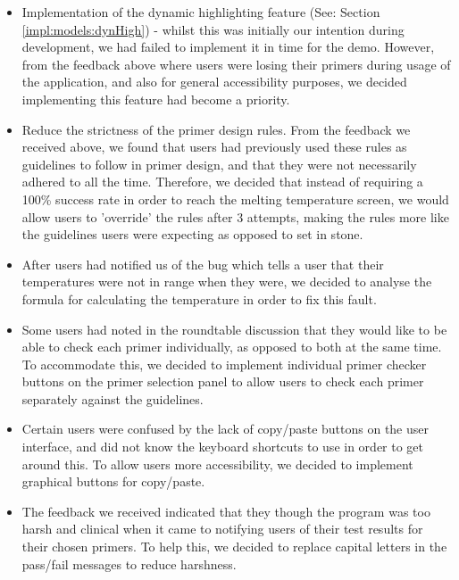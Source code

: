 \begin{itemize}

\item Implementation of the dynamic highlighting feature (See: Section \ref{impl:models:dynHigh}) - whilst this was initially our intention during development, we had failed to implement it in time for the demo. However, from the feedback above where users were losing their primers during usage of the application, and also for general accessibility purposes, we decided implementing this feature had become a priority.

\item Reduce the strictness of the primer design rules. From the feedback we received above, we found that users had previously used these rules as guidelines to follow in primer design, and that they were not necessarily adhered to all the time. Therefore, we decided that instead of requiring a 100\% success rate in order to reach the melting temperature screen, we would allow users to 'override' the rules after 3 attempts, making the rules more like the guidelines users were expecting as opposed to set in stone.

\item After users had notified us of the bug which tells a user that their temperatures were not in range when they were, we decided to analyse the formula for calculating the temperature in order to fix this fault.

\item Some users had noted in the roundtable discussion that they would like to be able to check each primer individually, as opposed to both at the same time. To accommodate this, we decided to implement individual primer checker buttons on the primer selection panel to allow users to check each primer separately against the guidelines.

\item Certain users were confused by the lack of copy/paste buttons on the user interface, and did not know the keyboard shortcuts to use in order to get around this. To allow users more accessibility, we decided to implement graphical buttons for copy/paste.

\item The feedback we received indicated that they though the program was too harsh and clinical when it came to notifying users of their test results for their chosen primers. To help this, we decided to replace capital letters in the pass/fail messages to reduce harshness.

\end{itemize}

